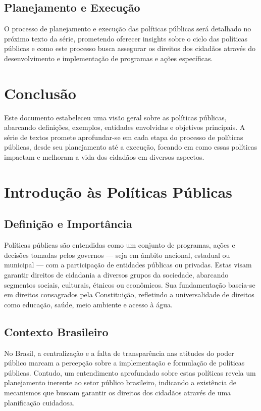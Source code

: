 \documentclass[
   article,       
   12pt,          
   oneside,       
   a4paper,       
   english,       
   brazil,        
   sumario=tradicional
   ]{abntex2}
\begin{document}
\subsection{Planejamento e Execução}
O processo de planejamento e execução das políticas públicas será detalhado no próximo texto da série, prometendo oferecer insights sobre o ciclo das políticas públicas e como este processo busca assegurar os direitos dos cidadãos através do desenvolvimento e implementação de programas e ações específicas.

\section{Conclusão}
Este documento estabeleceu uma visão geral sobre as políticas públicas, abarcando definições, exemplos, entidades envolvidas e objetivos principais. A série de textos promete aprofundar-se em cada etapa do processo de políticas públicas, desde seu planejamento até a execução, focando em como essas políticas impactam e melhoram a vida dos cidadãos em diversos aspectos.
\section{Introdução às Políticas Públicas}
\subsection{Definição e Importância}
Políticas públicas são entendidas como um conjunto de programas, ações e decisões tomadas pelos governos — seja em âmbito nacional, estadual ou municipal — com a participação de entidades públicas ou privadas. Estas visam garantir direitos de cidadania a diversos grupos da sociedade, abarcando segmentos sociais, culturais, étnicos ou econômicos. Sua fundamentação baseia-se em direitos consagrados pela Constituição, refletindo a universalidade de direitos como educação, saúde, meio ambiente e acesso à água.

\subsection{Contexto Brasileiro}
No Brasil, a centralização e a falta de transparência nas atitudes do poder público marcam a percepção sobre a implementação e formulação de políticas públicas. Contudo, um entendimento aprofundado sobre estas políticas revela um planejamento inerente ao setor público brasileiro, indicando a existência de mecanismos que buscam garantir os direitos dos cidadãos através de uma planificação cuidadosa.
\end{document}
